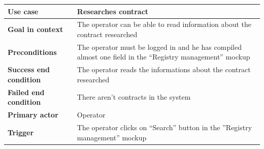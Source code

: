 {{{			\clearpage

			\begin{table}[h]
			\begin{tabular}{|p{4cm}|p{10cm}|}
			\hline
				\centering \vspace{1mm} \bfseries{Use case} \vspace{1mm} & 
				\vspace{1mm} Researches contract \vspace{1mm}\\
			\hline
				\centering \vspace{1mm} \bfseries{Goal in context} \vspace{1mm} & 
				\vspace{1mm} The operator can be able to read information about the contract researched \vspace{1mm}\\
			\hline
				\centering \vspace{1mm} \bfseries{Preconditions} \vspace{1mm} & 
				\vspace{1mm} The operator must be logged in and he has compiled almost one field in the “Registry management” mockup \vspace{1mm}\\
			\hline
				\centering \vspace{1mm} \bfseries{Success end condition} \vspace{1mm} & 
				\vspace{1mm} The operator reads the informations about the contract researched \vspace{1mm}\\
			\hline
				\centering \vspace{1mm} \bfseries{Failed end condition} \vspace{1mm} & 
				\vspace{1mm} There aren’t contracts in the system \vspace{1mm}\\
			\hline
				\centering \vspace{1mm} \bfseries{Primary actor} \vspace{1mm} & 
				\vspace{1mm} Operator \vspace{1mm}\\
			\hline
				\centering \vspace{1mm} \bfseries{Trigger} \vspace{1mm} & 
				\vspace{1mm} The operator clicks on “Search” button in the ”Registry management” mockup \vspace{1mm}\\

\end{tabular}
\end{table}}}}
